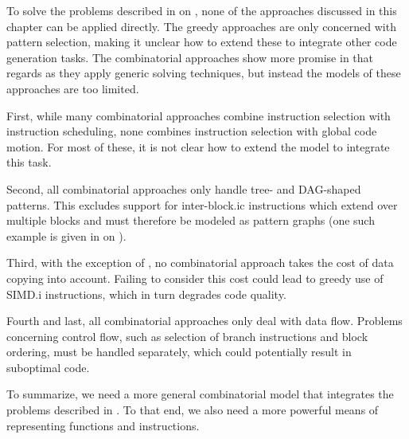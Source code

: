 To solve the problems described in  on
, none of the approaches discussed in this
chapter can be applied directly.
%
The greedy approaches are only concerned with \gls{pattern selection}, making it
unclear how to extend these to integrate other \gls{code generation} tasks.
%
The combinatorial approaches show more promise in that regards as they apply
generic solving techniques, but instead the models of these approaches are too
limited.

First, while many combinatorial approaches combine \gls{instruction
  selection} with \gls{instruction scheduling}, none combines \gls{instruction
  selection} with \gls{global code motion}.
%
For most of these, it is not clear how to extend the model to integrate this
task.

Second, all combinatorial approaches only handle \gls{tree}- and
\gls{DAG}-shaped \glspl{pattern}.
%
This excludes support for \gls{inter-block.ic} \glspl{instruction} which extend
over multiple \glspl{block} and must therefore be modeled as \glspl{pattern
  graph} (one such example is given in  on
).

Third, with the exception of \textcite{TanakaEtAl:2003}, no combinatorial
approach takes the cost of \gls{data copying} into account.
%
Failing to consider this cost could lead to greedy use of \gls{SIMD.i}
\glspl{instruction}, which in turn degrades code quality.

Fourth and last, all combinatorial approaches only deal with data flow.
%
Problems concerning control flow, such as selection of branch
\glspl{instruction} and \gls{block ordering}, must be handled separately, which
could potentially result in suboptimal code.

To summarize, we need a more general combinatorial model that integrates the
problems described in .
%
To that end, we also need a more powerful means of representing \glspl{function}
and \glspl{instruction}.
